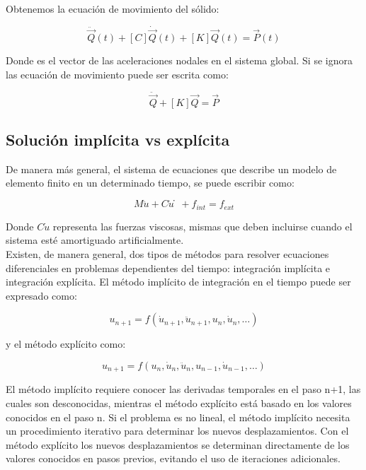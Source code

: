 Obtenemos la ecuación de movimiento del sólido:

\begin{equation}
[M] \ddot{\vec{Q}}(t) + [C] \dot{\vec{Q}}(t) + [K] \vec{Q} (t) = \vec{P} (t)
\end{equation}

Donde  es el vector de las aceleraciones nodales en el sistema global. Si se ignora 
las ecuación de movimiento puede ser escrita como:

\begin{equation}
[M] \ddot{\vec{Q}} + [K] \vec{Q} = \vec{P}
\end{equation}



\subsection{Solución implícita vs explícita}

De manera más general, el sistema de ecuaciones que describe un modelo de elemento finito en un determinado tiempo, se puede escribir como:

\begin{equation}
M\ddot{u} + C\dot{u} ̇+ f_{int} = f_{ext}
\end{equation}

Donde $C\dot{u}$ representa las fuerzas viscosas, mismas que deben incluirse cuando el sistema esté amortiguado artificialmente.\\ 
Existen, de manera general, dos tipos de métodos para resolver ecuaciones diferenciales  en problemas dependientes del tiempo: integración implícita e integración explícita. El método implícito de integración en el tiempo puede ser expresado como:

\begin{equation}
u_{n+1}=f(\dot{u}_{n+1},\ddot{u}_{n+1},u_n,\dot{u}_n,…)
\end{equation}

y el método explícito como:

\begin{equation}
u_{n+1}=f(u_n,\dot{u}_n,\ddot{u}_n,u_{n-1},\dot{u}_{n-1},…)
\end{equation}

El método implícito requiere conocer las derivadas temporales en el paso n+1, las cuales son desconocidas, mientras el método explícito está basado en los valores conocidos en el paso n. Si el problema es no lineal, el método implícito necesita un procedimiento iterativo para determinar los nuevos desplazamientos. Con el método explícito los nuevos desplazamientos se determinan directamente de los valores conocidos en pasos previos, evitando el uso de iteraciones adicionales.\\

